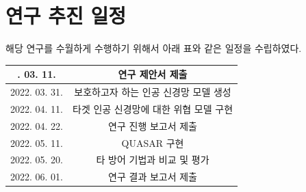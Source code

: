 \documentclass{article}
\begin{document}
\section{연구 추진 일정}

해당 연구를 수월하게 수행하기 위해서 아래 표와 같은 일정을 수립하였다. 

\begin{table}[h]
    \centering
    \label{t2}
    \begin{tabular}{c|c}
        \noalign{\smallskip}\noalign{\smallskip}\hline
        2022. 03. 11. & 연구 제안서 제출  \\
        \hline
        2022. 03. 31. & 보호하고자 하는 인공 신경망 모델 생성 \\
        \hline
        2022. 04. 11. & 타겟 인공 신경망에 대한 위협 모델 구현 \\
        \hline
        2022. 04. 22. & 연구 진행 보고서 제출  \\
        \hline
        2022. 05. 11. & QUASAR 구현 \\
        \hline
        2022. 05. 20. & 타 방어 기법과 비교 및 평가 \\
        \hline
        2022. 06. 01. & 연구 결과 보고서 제출  \\
        \hline
    \end{tabular}
\end{table}



\end{document}
